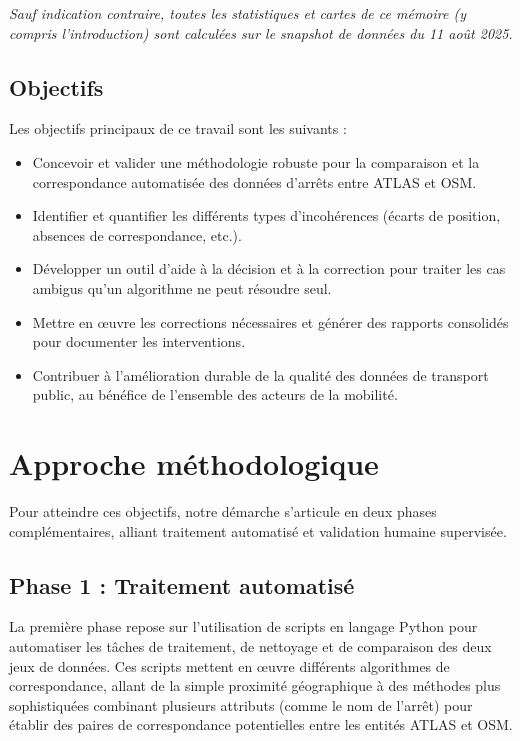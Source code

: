 \medskip
\noindent\textit{Sauf indication contraire, toutes les statistiques et cartes de ce mémoire (y compris l'introduction) sont calculées sur le snapshot de données du 11 août 2025.}

\subsection*{Objectifs}

Les objectifs principaux de ce travail sont les suivants :

\begin{itemize}
    \item Concevoir et valider une méthodologie robuste pour la comparaison et la correspondance automatisée des données d'arrêts entre ATLAS et OSM.
    
    \item Identifier et quantifier les différents types d'incohérences (écarts de position, absences de correspondance, etc.).
    
    \item Développer un outil d'aide à la décision et à la correction pour traiter les cas ambigus qu'un algorithme ne peut résoudre seul.
    
    \item Mettre en œuvre les corrections nécessaires et générer des rapports consolidés pour documenter les interventions.
    
    \item Contribuer à l'amélioration durable de la qualité des données de transport public, au bénéfice de l'ensemble des acteurs de la mobilité.
\end{itemize}

\section*{Approche méthodologique}

Pour atteindre ces objectifs, notre démarche s'articule en deux phases complémentaires, alliant traitement automatisé et validation humaine supervisée.

\subsection*{Phase 1 : Traitement automatisé}

La première phase repose sur l'utilisation de scripts en langage Python pour automatiser les tâches de traitement, de nettoyage et de comparaison des deux jeux de données. Ces scripts mettent en œuvre différents algorithmes de correspondance, allant de la simple proximité géographique à des méthodes plus sophistiquées combinant plusieurs attributs (comme le nom de l'arrêt) pour établir des paires de correspondance potentielles entre les entités ATLAS et OSM.

